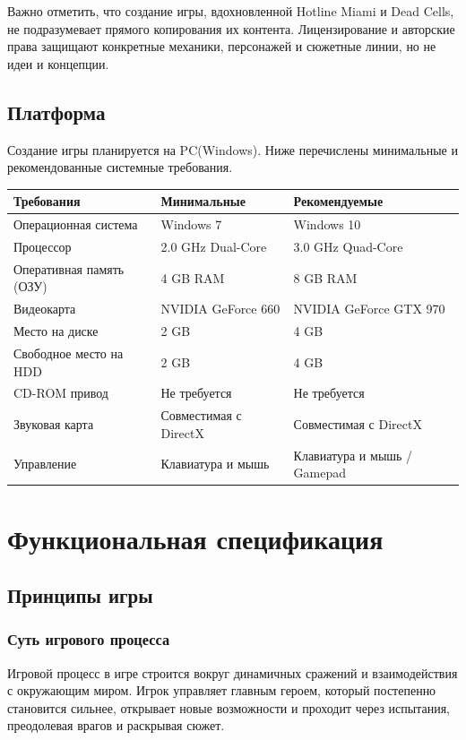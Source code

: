 \documentclass[12pt]{article}
\begin{document}
        \setlength{\parindent}{1.5em}Важно отметить, что создание игры, вдохновленной Hotline Miami и Dead Cells, не подразумевает прямого копирования их контента. Лицензирование и авторские права защищают конкретные механики, персонажей и сюжетные линии, но не идеи и концепции.
    \subsection{Платформа}
    Создание игры планируется на PC(Windows). Ниже перечислены минимальные и рекомендованные системные требования.
    \begin{table}[h]
    \centering
    \begin{tabular}{|l|l|l|} %
        \hline
        \textbf{Требования} & \textbf{Минимальные} & \textbf{Рекомендуемые} \\ 
        \hline
        Операционная система & Windows 7 & Windows 10 \\ 
        \hline
        Процессор & 2.0 GHz Dual-Core & 3.0 GHz Quad-Core \\ 
        \hline
        Оперативная память (ОЗУ) & 4 GB RAM & 8 GB RAM \\ 
        \hline
        Видеокарта & NVIDIA GeForce 660 & NVIDIA GeForce GTX 970 \\ 
        \hline
        Место на диске & 2 GB & 4 GB \\ 
        \hline
        Свободное место на HDD & 2 GB & 4 GB \\ 
        \hline
        CD-ROM привод & Не требуется & Не требуется \\ 
        \hline
        Звуковая карта & Совместимая с DirectX & Совместимая с DirectX \\ 
        \hline
        Управление & Клавиатура и мышь & Клавиатура и мышь / Gamepad \\ 
        \hline
    \end{tabular}
    \end{table}


\section{Функциональная спецификация}
    \subsection{Принципы игры}
        \subsubsection{Суть игрового процесса}
        Игровой процесс в игре строится вокруг динамичных сражений и взаимодействия с окружающим миром. Игрок управляет главным героем, который постепенно становится сильнее, открывает новые возможности и проходит через испытания, преодолевая врагов и раскрывая сюжет.  
    
\end{document}
